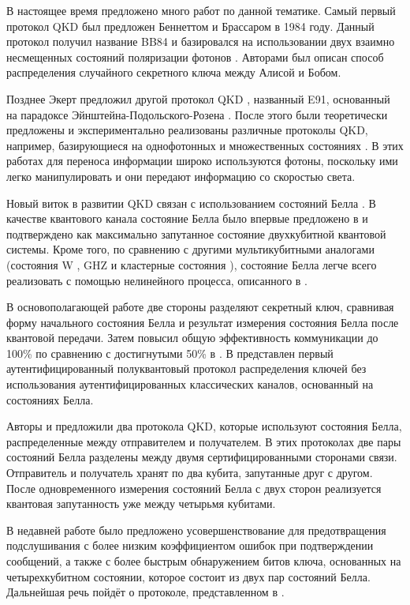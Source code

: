 \documentclass[a4paper,11pt]{article}
\begin{document}
В настоящее время предложено много работ по данной тематике. Самый первый протокол QKD был предложен Беннеттом и Брассаром в 1984 году. Данный протокол получил название BB84 и базировался на использовании двух взаимно несмещенных состояний поляризации фотонов \cite{BB84}. Авторами был описан способ распределения случайного секретного ключа между Алисой и Бобом. 
 
Позднее Экерт предложил другой протокол QKD \cite{E91}, названный E91, основанный на парадоксе Эйнштейна-Подольского-Розена \cite{EPR}. После этого были теоретически предложены и экспериментально реализованы различные протоколы QKD, например, базирующиеся на однофотонных \cite{liang2015simple} и множественных состояниях \cite{fourstate}. В этих работах для переноса информации широко используются фотоны, поскольку ими легко манипулировать и они передают информацию со скоростью света.

Новый виток в развитии QKD связан с использованием состояний Белла \cite{EPR}.
В качестве квантового канала состояние Белла было впервые предложено в \cite{Gao} и подтверждено \cite{bellstatescomp} как максимально запутанное состояние двухкубитной квантовой системы. Кроме того, по сравнению с другими мультикубитными аналогами (состояния W \cite{W}, GHZ \cite{GHZ} и кластерные состояния \cite{cluster}), состояние Белла легче всего реализовать с помощью нелинейного процесса, описанного в  \cite{twophotons}. 

В основополагающей работе \cite{Gao} две стороны разделяют секретный ключ, сравнивая форму начального состояния Белла и результат измерения состояния Белла после квантовой передачи.
Затем \cite{nine} повысил общую эффективность коммуникации до 100\% по сравнению с достигнутыми 50\% в \cite{Gao}. В \cite{ten} представлен первый аутентифицированный полуквантовый протокол распределения ключей без использования аутентифицированных классических каналов, основанный на состояниях Белла.

Авторы \cite{Gao} и \cite{nine} предложили два протокола QKD, которые используют состояния Белла, распределенные между отправителем и получателем. В этих протоколах две пары состояний Белла разделены между двумя сертифицированными сторонами связи. Отправитель и получатель хранят по два кубита, запутанные друг с другом. После одновременного измерения состояний Белла с двух сторон реализуется квантовая запутанность уже между четырьмя кубитами.

В недавней работе \cite{base} было предложено усовершенствование \cite{nine} для предотвращения подслушивания с более низким коэффициентом ошибок при подтверждении сообщений, а также с более быстрым обнаружением битов ключа, основанных на четырехкубитном состоянии, которое состоит из двух пар состояний Белла. Дальнейшая речь пойдёт о протоколе, представленном в \cite{base}.
\end{document}
